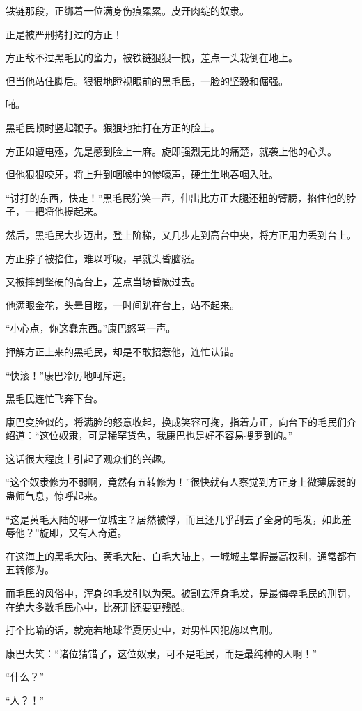 \begin{this_body}
铁链那段，正绑着一位满身伤痕累累。皮开肉绽的奴隶。

正是被严刑拷打过的方正！

方正敌不过黑毛民的蛮力，被铁链狠狠一拽，差点一头栽倒在地上。

但当他站住脚后。狠狠地瞪视眼前的黑毛民，一脸的坚毅和倔强。

啪。

黑毛民顿时竖起鞭子。狠狠地抽打在方正的脸上。

方正如遭电殛，先是感到脸上一麻。旋即强烈无比的痛楚，就袭上他的心头。

但他狠狠咬牙，将上升到咽喉中的惨嚎声，硬生生地吞咽入肚。

“讨打的东西，快走！”黑毛民狞笑一声，伸出比方正大腿还粗的臂膀，掐住他的脖子，一把将他提起来。

然后，黑毛民大步迈出，登上阶梯，又几步走到高台中央，将方正用力丢到台上。

方正脖子被掐住，难以呼吸，早就头昏脑涨。

又被摔到坚硬的高台上，差点当场昏厥过去。

他满眼金花，头晕目眩，一时间趴在台上，站不起来。

“小心点，你这蠢东西。”康巴怒骂一声。

押解方正上来的黑毛民，却是不敢招惹他，连忙认错。

“快滚！”康巴冷厉地呵斥道。

黑毛民连忙飞奔下台。

康巴变脸似的，将满脸的怒意收起，换成笑容可掬，指着方正，向台下的毛民们介绍道：“这位奴隶，可是稀罕货色，我康巴也是好不容易搜罗到的。”

这话很大程度上引起了观众们的兴趣。

“这个奴隶修为不弱啊，竟然有五转修为！”很快就有人察觉到方正身上微薄孱弱的蛊师气息，惊呼起来。

“这是黄毛大陆的哪一位城主？居然被俘，而且还几乎刮去了全身的毛发，如此羞辱他？”旋即，又有人奇道。

在这海上的黑毛大陆、黄毛大陆、白毛大陆上，一城城主掌握最高权利，通常都有五转修为。

而毛民的风俗中，浑身的毛发引以为荣。被割去浑身毛发，是最侮辱毛民的刑罚，在绝大多数毛民心中，比死刑还要更残酷。

打个比喻的话，就宛若地球华夏历史中，对男性囚犯施以宫刑。

康巴大笑：“诸位猜错了，这位奴隶，可不是毛民，而是最纯种的人啊！”

“什么？”

“人？！”


\end{this_body}
